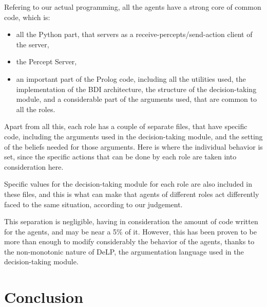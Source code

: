 \documentclass{llncs2e/llncs}
\begin{document}
    Refering to our actual programming, all the agents have a strong core of common
    code, which is:
    
    \begin{itemize}
    \item all the Python part, that servers as a receive-percepts/send-action client 
    of the server,
    
    \item the Percept Server,
    
    \item an important part of the Prolog code, including all the utilities used, the
    implementation of the BDI architecture, the structure of the 
    decision-taking module, and a considerable part of the arguments used, that
    are common to all the roles.
    \end{itemize}
    
    Apart from all this, each role has a couple of separate files, that have 
    specific code, including the arguments used in the decision-taking module, and
    the setting of the beliefs needed for those arguments. Here is where the 
    individual behavior is set, since the specific actions that can be done by each
    role are taken into consideration here.
    
    Specific values for the decision-taking module for each role are also included
    in these files, and this is what can make that agents of different roles act 
    differently faced to the same situation, according to our judgement.
    
    This separation is negligible, having in consideration the amount of code 
    written for the agents, and may be near a 5\% of it. However, this has been proven to
    be more than enough to modify considerably the behavior of the agents, thanks to
    the non-monotonic nature of DeLP, the argumentation language used in the 
    decision-taking module.

\section{Conclusion}

\end{document}
